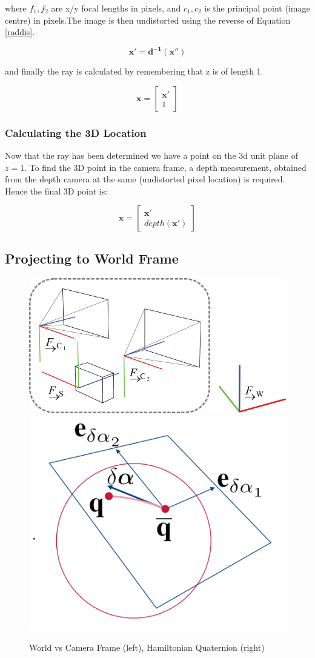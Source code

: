 \documentclass[a4paper,11pt,notitlepage]{article}
\begin{document}
where $f_{1},f_{2}$ are x/y focal lengths in pixels, and $c_{1},c_{2}$ is the principal point (image centre) in pixels.The image is then undistorted using the reverse of Equation \ref{raddis}.

\begin{equation}
\mathbf{x'} = \mathbf{d^{-1}(x'')}
\label{camera_scale}
\end{equation}

and finally the ray is calculated by remembering that z is of length 1.

\begin{equation}
\mathbf{x} = 
\begin{bmatrix}
\mathbf{x'} \\
1
\end{bmatrix}
\label{to_3d_ray}
\end{equation}

\subsubsection{Calculating the 3D Location}

Now that the ray has been determined we have a point on the 3d unit plane of $z=1$. To find the 3D point in the camera frame, a depth measurement, obtained from the depth camera at the same (undistorted pixel location) is required. Hence the final 3D point is:

\begin{equation}
\mathbf{x} = 
\begin{bmatrix}
\mathbf{x'} \\
depth(\mathbf{x'})
\end{bmatrix}
\label{camera_scale}
\end{equation}

\subsection{Projecting to World Frame}


\noindent \begin{figure}[h!]
\includegraphics[width = 0.5\hsize]{figures/world_to_cam.jpg}
\includegraphics[width = 0.35\hsize]{figures/quaternions.png}
\caption{World vs Camera Frame (left)\cite{Okvis_1}, Hamiltonian Quaternion (right)}
\label{quat_wcs}
\end{figure}
\end{document}
